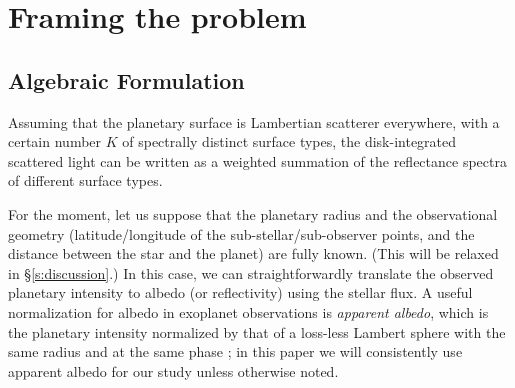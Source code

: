 \documentclass[iop,numberedappendix,apj,]{emulateapj}
\begin{document}
\section{Framing the problem}
\label{s:frame}


\subsection{Algebraic Formulation}
\label{ss:model}

Assuming that the planetary surface is Lambertian scatterer everywhere, with a certain number $K$ of spectrally distinct surface types, 
the disk-integrated scattered light can be written as a weighted summation of the reflectance spectra of different surface types. 

For the moment, let us suppose that the planetary radius and the observational geometry (latitude/longitude of the sub-stellar/sub-observer points, and the distance between the star and the planet) are fully known. (This will be relaxed in \S\ref{s:discussion}.) 
In this case, we can straightforwardly translate the observed planetary intensity to albedo (or reflectivity) using the stellar flux. 
A useful normalization for albedo in exoplanet observations is {\it apparent albedo}, which is the planetary intensity normalized by that of a loss-less Lambert sphere with the same radius and at the same phase \citep{Qiu2003, Seager2010}; in this paper we will consistently use apparent albedo for our study unless otherwise noted. 
\end{document}
